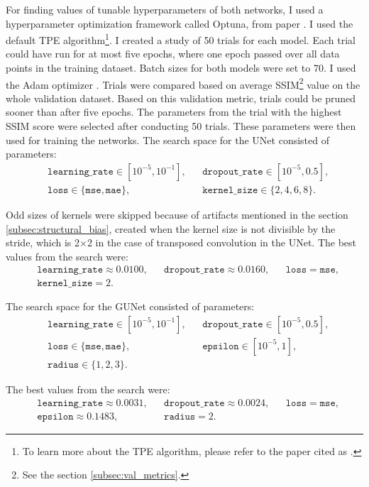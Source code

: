 For finding values of tunable hyperparameters of both networks, I used a hyperparameter optimization framework called Optuna, from paper \cite{optuna}. I used the default \gls{TPE} algorithm\footnote{To learn more about the TPE algorithm, please refer to the paper cited as \cite[pg. 4]{tpe}.}. I created a study of 50 trials for each model. Each trial could have run for at most five epochs, where one epoch passed over all data points in the training dataset. Batch sizes for both models were set to 70. I used the Adam optimizer \cite{adam}. Trials were compared based on average \gls{SSIM}\footnote{See the section \ref{subsec:val_metrics}.} value on the whole validation dataset. Based on this validation metric, trials could be pruned sooner than after five epochs. The parameters from the trial with the highest \gls{SSIM} score were selected after conducting 50 trials. These parameters were then used for training the networks. The search space for the UNet consisted of parameters:
\begin{align*}
    &\texttt{learning\_rate} \in [10^{-5},10^{-1}],     &   &\texttt{dropout\_rate} \in [10^{-5},0.5],\\
    &\texttt{loss} \in \{\texttt{mse},\texttt{mae}\},   &   &\texttt{kernel\_size} \in \{2,4,6,8\}.
\end{align*}

\noindent Odd sizes of kernels were skipped because of artifacts mentioned in the section \ref{subsec:structural_bias}, created when the kernel size is not divisible by the stride, which is 2×2 in the case of transposed convolution in the UNet. The best values from the search were:
\begin{align*}
    &\texttt{learning\_rate} \approx 0.0100,  &   &\texttt{dropout\_rate} \approx 0.0160, & &\texttt{loss} = \texttt{mse},\\
    &\texttt{kernel\_size} = 2.
\end{align*}

\noindent The search space for the \gls{GUNet} consisted of parameters:
\begin{align*}
    &\texttt{learning\_rate} \in [10^{-5},10^{-1}],     &   &\texttt{dropout\_rate} \in [10^{-5},0.5],\\
    &\texttt{loss} \in \{\texttt{mse},\texttt{mae}\},   &   &\texttt{epsilon} \in [10^{-5},1], \\
    &\texttt{radius} \in \{1,2,3\}.
\end{align*}

\noindent The best values from the search were:
\begin{align*}
    &\texttt{learning\_rate} \approx 0.0031,    &   &\texttt{dropout\_rate} \approx 0.0024,&  &\texttt{loss} = \texttt{mse},\\
    &\texttt{epsilon} \approx 0.1483,           &   &\texttt{radius} = 2.
\end{align*}

